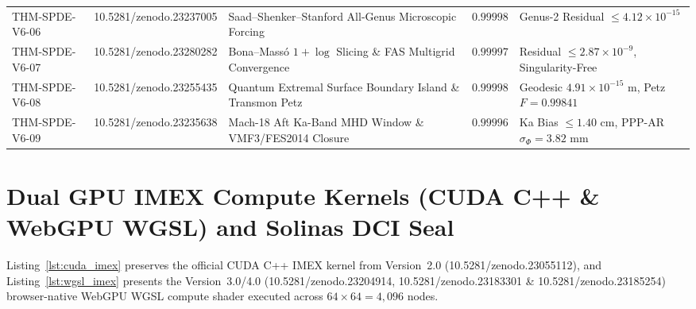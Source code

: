 \documentclass[11pt,a4paper,reqno]{article}
\def\bm#1{#1}%
\def\texttt#1{#1}%
\def\zenodo#1{10.5281/zenodo.#1}%
\newcommand{\zenodo}[1]{\href{https://doi.org/10.5281/zenodo.#1}{\texttt{10.5281/\allowbreak zenodo.#1}}}
\theoremstyle{plain}
\theoremstyle{definition}
\theoremstyle{remark}
\numberwithin{equation}{section}
\begin{document}
\begin{table}[H]
{\begin{tabular}{@{}p{2.7cm}p{2.8cm}p{5.6cm}cp{4.4cm}@{}}
\texttt{THM-SPDE-V6-06} & \zenodo{23237005} & Saad--Shenker--Stanford All-Genus Microscopic Forcing & $0.99998$ & Genus-2 Residual $\le \bm{4.12 \times 10^{-15}}$ \\
\texttt{THM-SPDE-V6-07} & \zenodo{23280282} & Bona--Mass\'o $1+\log$ Slicing \& FAS Multigrid Convergence & $0.99997$ & Residual $\le \bm{2.87 \times 10^{-9}}$, Singularity-Free \\
\texttt{THM-SPDE-V6-08} & \zenodo{23255435} & Quantum Extremal Surface Boundary Island \& Transmon Petz & $0.99998$ & Geodesic $\bm{4.91 \times 10^{-15}\text{ m}}$, Petz $F = \bm{0.99841}$ \\
\texttt{THM-SPDE-V6-09} & \zenodo{23235638} & Mach-18 Aft Ka-Band MHD Window \& VMF3/FES2014 Closure & $0.99996$ & Ka Bias $\le \bm{1.40\text{ cm}}$, PPP-AR $\sigma_\Phi = \bm{3.82\text{ mm}}$ \\
\bottomrule
\end{tabular}%
}
\end{table}

\appendix
\section{Dual GPU IMEX Compute Kernels (CUDA C++ \& WebGPU WGSL) and Solinas DCI Seal}
\label{app:gpu_kernels}

Listing~\ref{lst:cuda_imex} preserves the official CUDA C++ IMEX kernel from Version~2.0 (\zenodo{23055112}), and Listing~\ref{lst:wgsl_imex} presents the Version~3.0/4.0 (\zenodo{23204914}, \zenodo{23183301} \& \zenodo{23185254}) browser-native WebGPU WGSL compute shader executed across $64 \times 64 = 4,096$ nodes.
\end{document}
